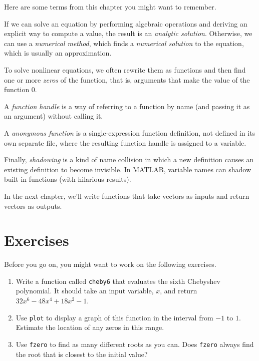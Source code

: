 \documentclass[../../book.tex]{subfiles}
\begin{document}
Here are some terms from this chapter you might want to remember.

If we can solve an equation by performing algebraic operations and deriving an explicit way to compute a value, the result is an \emph{analytic solution}.
Otherwise, we can use a \emph{numerical method}, which finds a \emph{numerical solution} to the equation, which is usually an approximation.

To solve nonlinear equations, we often rewrite them as functions and then find one or more \emph{zeros} of the function, that is, arguments that make the value of the function $0$.

A \emph{function handle} is a way of
referring to a function by name (and passing it as an argument)
without calling it.

A \emph{anonymous function} is a single-expression function definition, not defined in its own separate file, where the resulting function handle is assigned to a variable.

Finally, \emph{shadowing} is a kind of name collision in which a new definition
causes an existing definition to become invisible.  In MATLAB,
variable names can shadow built-in functions (with hilarious results).

In the next chapter, we'll write functions that take vectors as inputs and return vectors as outputs.


\section{Exercises}

Before you go on, you might want to work on the following exercises.

\begin{ex}

\begin{enumerate}


\item Write a function called \lstinline{cheby6} that evaluates the
sixth Chebyshev polynomial.  It should take an input variable,
$x$, and return $32 x^6 - 48 x^4 + 18 x^2 - 1$.

\item Use \lstinline{plot} to display a graph of this function in the
interval from $-1$ to $1$.  Estimate the location of any zeros in this
range.

\item Use \lstinline{fzero} to find as many different roots as you can.
Does \lstinline{fzero} always find the root that is closest to the initial
value?

\end{enumerate}

\end{ex}
\end{document}

